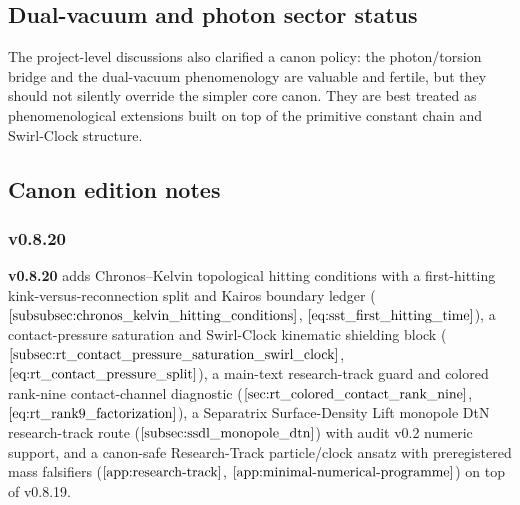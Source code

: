 \documentclass[11pt]{article}
\theoremstyle{definition}
\theoremstyle{plain}
\theoremstyle{remark}
\begin{document}
        \subsection{Dual-vacuum and photon sector status}
            The project-level discussions also clarified a canon policy: the photon/torsion bridge and the dual-vacuum phenomenology are valuable and fertile, but they should not silently override the simpler core canon. They are best treated as phenomenological extensions built on top of the primitive constant chain and Swirl-Clock structure.

        \subsection{Canon edition notes}

        \subsubsection{v0.8.20}
            \textbf{v0.8.20} adds Chronos--Kelvin topological hitting conditions with a first-hitting kink-versus-reconnection split and Kairos boundary ledger (\(\ref{subsubsec:chronos_kelvin_hitting_conditions}\), \(\ref{eq:sst_first_hitting_time}\)), a contact-pressure saturation and Swirl-Clock kinematic shielding block (\(\ref{subsec:rt_contact_pressure_saturation_swirl_clock}\), \(\ref{eq:rt_contact_pressure_split}\)), a main-text research-track guard and colored rank-nine contact-channel diagnostic (\(\ref{sec:rt_colored_contact_rank_nine}\), \(\ref{eq:rt_rank9_factorization}\)), a Separatrix Surface-Density Lift monopole DtN research-track route (\(\ref{subsec:ssdl_monopole_dtn}\)) with audit v0.2 numeric support, and a canon-safe Research-Track particle/clock ansatz with preregistered mass falsifiers (\(\ref{app:research-track}\), \(\ref{app:minimal-numerical-programme}\)) on top of v0.8.19.
\end{document}
